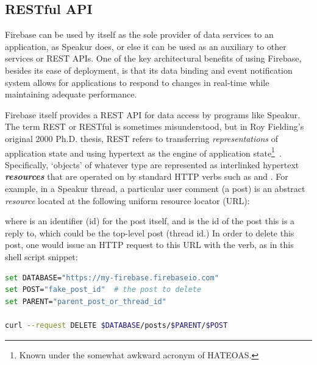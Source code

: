 \subsection{RESTful API}
Firebase can be used by itself as the sole provider of data services to an application, as Speakur does, or else it can be used as an auxiliary to other services or REST APIs.
One of the key architectural benefits of using Firebase, 
besides its ease of deployment, 
is that its data binding and event notification system allows for 
applications to respond to changes in real-time while maintaining adequate performance.

Firebase itself provides a REST API for data access by programs like Speakur.
The term REST or RESTful is sometimes misunderstood,
but in Roy Fielding's original 2000 Ph.D. thesis, 
REST refers to transferring \textit{representations} of application state and using hypertext as the engine of 
application state\footnote{Known under the somewhat awkward acronym of HATEOAS.}~\cite{fielding2000}.
Specifically, `objects' of whatever type are represented as interlinked hypertext \textbf{\textit{resources}} that are operated on by standard HTTP verbs such as  and .
For example, in a Speakur thread, a particular user comment (a post) is an abstract \textit{resource} located at the following uniform resource locator (URL):



where  is an identifier (id) for the post itself, and  is the id of the post this is a reply to, 
which could be the top-level post (thread id.) 
In order to delete this post, one would issue an HTTP request to this URL with the  verb, as in this  shell script snippet:

\begin{lstlisting}[language=bash,caption=
{Deleting a post with the REST API.},label=l:rest_delete,captionpos=below]
set DATABASE="https://my-firebase.firebaseio.com"
set POST="fake_post_id"  # the post to delete
set PARENT="parent_post_or_thread_id"

curl --request DELETE $DATABASE/posts/$PARENT/$POST
\end{lstlisting}

